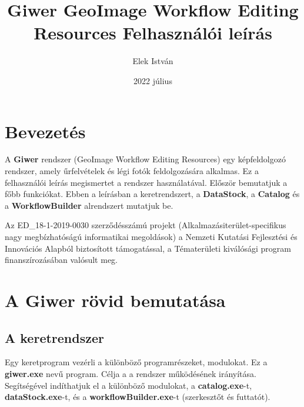 \documentclass[a4paper,12pt]{article}
\begin{document}
\author{Elek István}

\title{Giwer \linebreak \linebreak GeoImage Workflow Editing Resources  \linebreak  \linebreak \small Felhasználói leírás \linebreak \linebreak}


\date{2022 július}


\setcounter{tocdepth}{3}
\maketitle
\newpage
\tableofcontents
\newpage


\section*{Bevezetés}

A \textbf{Giwer} rendszer (GeoImage Workflow Editing Resources) egy képfeldolgozó rendszer, amely űrfelvételek és légi fotók feldolgozására alkalmas. Ez a felhasználói leírás megismertet a rendszer használatával. Először bemutatjuk a főbb funkciókat. Ebben a leírásban a keretrendszert, a \textbf{DataStock}, a \textbf{Catalog} és a \textbf{WorkflowBuilder} alrendszert mutatjuk be. 

Az ED\_18-1-2019-0030 szerződésszámú projekt (Alkalmazásiterület-specifikus nagy megbízhatóságú informatikai megoldások)  a Nemzeti Kutatási Fejlesztési és Innovációs Alapból biztosított támogatással, a Tématerületi kiválósági program finanszírozásában valósult meg.



\section{A Giwer rövid bemutatása}

\subsection{A keretrendszer}

Egy keretprogram vezérli a különböző programrészeket, modulokat. Ez a \textbf{giwer.exe} nevű program. Célja a a rendszer működésének irányítása. Segítségével indíthatjuk el a különböző modulokat, a \textbf{catalog.exe}-t, \textbf{dataStock.exe}-t, és a \textbf{workflowBuilder.exe}-t (szerkesztőt és futtatót). 
\end{document}
